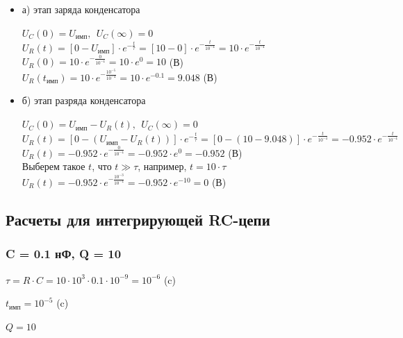 \begin{itemize}
\item[] а) этап заряда конденсатора

		$U_C(0)	= U_\text{имп},\ \ U_C(\infty) = 0$\\		
		$U_R(t) = [0 - U_\text{имп}] \cdot e^{-\frac{t}{\tau}} = [10 - 0] \cdot e^{-\frac{t}{10^{-4}}} = 10 \cdot e^{-\frac{t}{10^{-4}}}$\\
		$U_R(0) = 10 \cdot e^{-\frac{0}{10^{-4}}} = 10 \cdot e^0 = 10$ (В)\\
		$U_R(t_\text{имп}) = 10 \cdot e^{-\frac{10^{-5}}{10^{-4}}} = 10 \cdot e^{-0.1} = 9.048$ (В)\\

\item[] б) этап разряда конденсатора
		
		$U_C(0)	= U_\text{имп} - U_R(t),\ \ U_C(\infty) = 0$\\
		$U_R(t) = [0 - (U_\text{имп} - U_R(t))] \cdot e^{-\frac{t}{\tau}} = [0 - (10 - 9.048)] \cdot e^{-\frac{t}{10^{-4}}} = -0.952 \cdot e^{-\frac{t}{10^{-4}}}$\\
		$U_R(t) = -0.952 \cdot e^{-\frac{0}{10^{-4}}} = -0.952 \cdot e^0 = -0.952$ (В)\\
		Выберем такое $t$, что $t \gg \tau$, например, $t = 10 \cdot \tau$ \\
		$U_R(t) = -0.952 \cdot e^{-\frac{10^{-3}}{10^{-4}}} = -0.952 \cdot e^{-10} = 0$ (В)\\
		
\end{itemize}

\subsection{Расчеты для интегрирующей RC-цепи}

\subsubsection{C = 0.1 нФ, Q = 10}

		$\tau = R \cdot C = 10 \cdot 10^3 \cdot 0.1 \cdot 10^{-9} = 10^{-6}$ (c)
		
		$t_\text{имп} = 10^{-5}$ (c)
		
		$Q = 10$		
		
